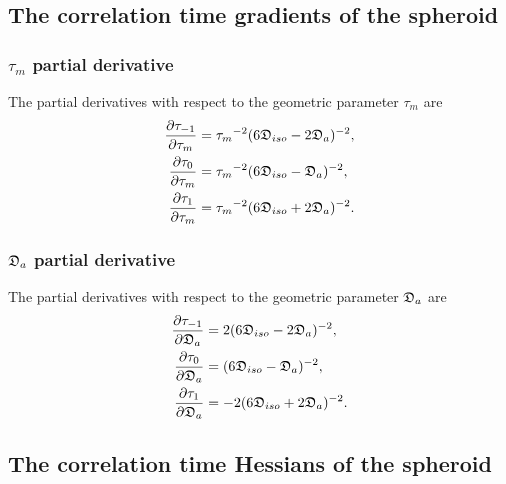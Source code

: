 
\subsection{The correlation time gradients of the spheroid}


\subsubsection{$\tau_m$ partial derivative}

The partial derivatives with respect to the geometric parameter $\tau_m$ are
\begin{subequations}
\begin{align}
    \frac{\partial \tau_{-1}}{\partial \tau_m} &= {\tau_m}^{-2} (6\mathfrak{D}_{iso} - 2\mathfrak{D}_a)^{-2}, \\
    \frac{\partial \tau_{0}}{\partial \tau_m}  &= {\tau_m}^{-2} (6\mathfrak{D}_{iso} - \mathfrak{D}_a)^{-2}, \\
    \frac{\partial \tau_{1}}{\partial \tau_m}  &= {\tau_m}^{-2} (6\mathfrak{D}_{iso} + 2\mathfrak{D}_a)^{-2}.
\end{align}
\end{subequations}



\subsubsection{$\mathfrak{D}_a$ partial derivative}

The partial derivatives with respect to the geometric parameter $\mathfrak{D}_a$ are
\begin{subequations}
\begin{align}
    \frac{\partial \tau_{-1}}{\partial \mathfrak{D}_a} &= 2(6\mathfrak{D}_{iso} - 2\mathfrak{D}_a)^{-2}, \\
    \frac{\partial \tau_{0}}{\partial \mathfrak{D}_a}  &= (6\mathfrak{D}_{iso} - \mathfrak{D}_a)^{-2}, \\
    \frac{\partial \tau_{1}}{\partial \mathfrak{D}_a}  &= -2(6\mathfrak{D}_{iso} + 2\mathfrak{D}_a)^{-2}.
\end{align}
\end{subequations}




\subsection{The correlation time Hessians of the spheroid}



